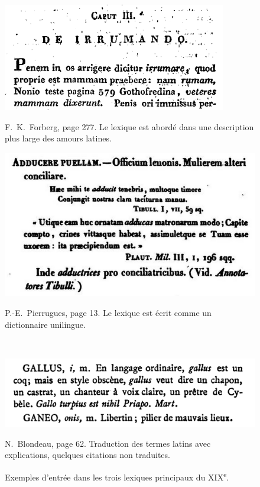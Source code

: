 \begin{figure}
    \begin{minipage}{.45\linewidth}
        \includegraphics[width=\linewidth]{figures/chap1/part3/277_forberg.png}
        \caption{F.~K.~Forberg, page 277. Le lexique est abordé dans une description plus large des amours latines.}
    \end{minipage}%
    \hfill %
    \begin{minipage}{.45\linewidth}
        \includegraphics[width=\linewidth]{figures/chap1/part3/13_pierrugues.png}
        \caption{P.-E.~Pierrugues, page 13. Le lexique est écrit comme un dictionnaire unilingue.}
    \end{minipage}%
    \\
    \centering
    \begin{minipage}{.5\linewidth}
        \centering
        \includegraphics[width=\linewidth]{figures/chap1/part3/62_blondeau.png}
        \caption{N.~Blondeau, page 62. Traduction des termes latins avec explications, quelques citations non traduites.}
    \end{minipage}
    \caption{Exemples d'entrée dans les trois lexiques principaux du XIX\textsuperscript{e}.}
    \label{fig:chap1:exemples_dictionnaires}
\end{figure}


